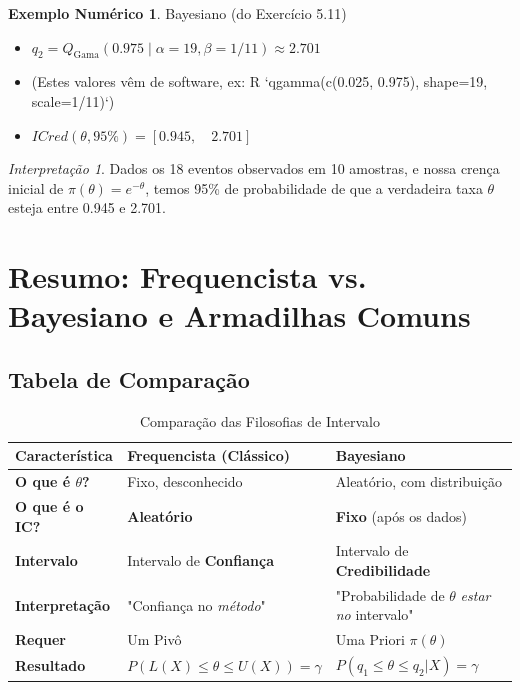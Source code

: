 \documentclass[12pt, a4paper]{article}
\theoremstyle{definition} %
\newtheorem{exemplo}{Exemplo Numérico}[section]
\theoremstyle{remark} %
\newtheorem{interpretacao}{Interpretação}[section]
\begin{document}
\begin{exemplo}{Bayesiano (do Exercício 5.11)}
\begin{itemize}
        \item $q_2 = Q_{\text{Gama}}(0.975 \mid \alpha=19, \beta=1/11) \approx 2.701$
        \item (Estes valores vêm de software, ex: R `qgamma(c(0.025, 0.975), shape=19, scale=1/11)`)
        \item $ICred(\theta, 95\%) = [0.945, \quad 2.701]$
    \end{itemize}
    \begin{interpretacao}
        Dados os 18 eventos observados em 10 amostras, e nossa crença inicial de $\pi(\theta)=e^{-\theta}$, temos 95\% de probabilidade de que a verdadeira taxa $\theta$ esteja entre 0.945 e 2.701.
    \end{interpretacao}
\end{exemplo}

\section{Resumo: Frequencista vs. Bayesiano e Armadilhas Comuns}

\subsection{Tabela de Comparação}

\begin{table}[H]
    \centering
    \caption{Comparação das Filosofias de Intervalo}
    \begin{tabular}{@{}lll@{}}
        \toprule
        Característica & Frequencista (Clássico) & Bayesiano \\ \midrule
        \textbf{O que é $\theta$?} & Fixo, desconhecido & Aleatório, com distribuição \\
        \textbf{O que é o IC?} & \textbf{Aleatório} & \textbf{Fixo} (após os dados) \\
        \textbf{Intervalo} & Intervalo de \textbf{Confiança} & Intervalo de \textbf{Credibilidade} \\
        \textbf{Interpretação} & "Confiança no \textit{método}" & "Probabilidade de $\theta$ \textit{estar no} intervalo" \\
        \textbf{Requer} & Um Pivô & Uma Priori $\pi(\theta)$ \\
        \textbf{Resultado} & $P(L(X) \le \theta \le U(X)) = \gamma$ & $P(q_1 \le \theta \le q_2 | X) = \gamma$ \\
        \bottomrule
    \end{tabular}
\end{table}
\end{document}
